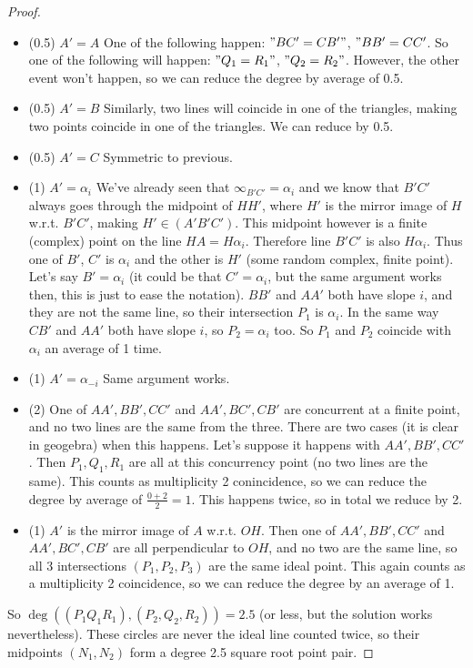 \documentclass[a4paper]{article}
\begin{document}
\begin{proof}
\begin{itemize}
    \item (0.5) $A'=A$ One of the following happen: $"BC'=CB'"$, $"BB'=CC'$. So one of the following will happen: $"Q_1=R_1"$, $"Q_2=R_2"$. However, the other event won't happen, so we can reduce the degree by average of 0.5.
    \item (0.5) $A'=B$ Similarly, two lines will coincide in one of the triangles, making two points coincide in one of the triangles. We can reduce by 0.5.
    \item (0.5) $A'=C$ Symmetric to previous.
    \item (1) $A'=\alpha_i$ We've already seen that $\infty_{B'C'}=\alpha_i$ and we know that $B'C'$ always goes through the midpoint of $HH'$, where $H'$ is the mirror image of $H$ w.r.t. $B'C'$, making $H'\in (A'B'C')$. This midpoint however is a finite (complex) point on the line $HA=H\alpha_i$. Therefore line $B'C'$ is also $H\alpha_i$. Thus one of $B'$, $C'$ is $\alpha_i$ and the other is $H'$ (some random complex, finite point). Let's say $B'=\alpha_i$ (it could be that $C'=\alpha_i$, but the same argument works then, this is just to ease the notation). $BB'$ and $AA'$ both have slope $i$, and they are not the same line, so their intersection $P_1$ is $\alpha_i$. In the same way $CB'$ and $AA'$ both have slope $i$, so $P_2=\alpha_i$ too. So $P_1$ and $P_2$ coincide with $\alpha_i$ an average of 1 time.
    \item (1) $A'=\alpha_{-i}$ Same argument works.
    \item (2) One of $AA',BB',CC'$ and $AA',BC',CB'$ are concurrent at a finite point, and no two lines are the same from the three. There are two cases (it is clear in geogebra) when this happens. Let's suppose it happens with $AA',BB',CC'$. Then $P_1, Q_1, R_1$ are all at this concurrency point (no two lines are the same). This counts as multiplicity 2 conincidence, so we can reduce the degree by average of $\frac{0+2}{2}=1$. This happens twice, so in total we reduce by 2.
    \item (1) $A'$ is the mirror image of $A$ w.r.t. $OH$. Then one of $AA',BB',CC'$ and $AA',BC',CB'$ are all perpendicular to $OH$, and no two are the same line, so all 3 intersections $(P_1, P_2, P_3)$ are the same ideal point. This again counts as a multiplicity 2 coincidence, so we can reduce the degree by an average of 1.
    
\end{itemize}

So $\deg ((P_1Q_1R_1),(P_2,Q_2,R_2))=2.5$ (or less, but the solution works nevertheless). These circles are never the ideal line counted twice, so their midpoints $(N_1,N_2)$ form a degree 2.5 square root point pair.


\end{proof}
\end{document}
